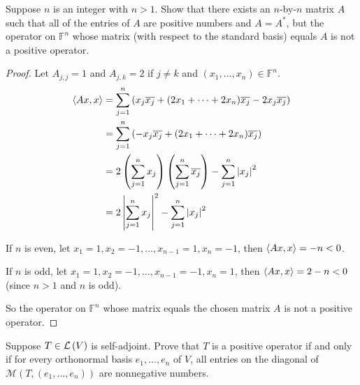 \begin{exercise}
    Suppose $n$ is an integer with $n > 1$. Show that there exists an $n$-by-$n$ matrix $A$ such that all of the entries of $A$ are positive numbers and $A = A^{*}$, but the operator on $\mathbb{F}^{n}$ whose matrix (with respect to the standard basis) equals $A$ is not a positive operator.
\end{exercise}

\begin{proof}
    Let $A_{j,j} = 1$ and $A_{j,k} = 2$ if $j\ne k$ and $(x_{1}, \ldots, x_{n})\in \mathbb{F}^{n}$.
    \begin{align*}
        \left\langle{Ax, x}\right\rangle & = \sum^{n}_{j=1}\left(x_{j}\overline{x_{j}} + (2x_{1} + \cdots + 2x_{n})\overline{x_{j}} - 2x_{j}\overline{x_{j}}\right) \\
                          & = \sum^{n}_{j=1}\left(-x_{j}\overline{x_{j}} + (2x_{1} + \cdots + 2x_{n})\overline{x_{j}}\right)                     \\
                          & = 2\left(\sum^{n}_{j=1}x_{j}\right)\left(\sum^{n}_{j=1}\overline{x_{j}}\right) - \sum^{n}_{j=1}\left\vert{x_{j}}\right\vert^{2}   \\
                          & = 2\left\vert{\sum^{n}_{j=1}x_{j}}\right\vert^{2} - \sum^{n}_{j=1}\left\vert{x_{j}}\right\vert^{2}
    \end{align*}

    If $n$ is even, let $x_{1} = 1, x_{2} = -1, \ldots, x_{n-1} = 1, x_{n} = -1$, then $\left\langle{Ax, x}\right\rangle = -n < 0$.

    If $n$ is odd, let $x_{1} = 1, x_{2} = -1, \ldots, x_{n-1} = -1, x_{n} = 1$, then $\left\langle{Ax, x}\right\rangle = 2 - n < 0$ (since $n > 1$ and $n$ is odd).

    So the operator on $\mathbb{F}^{n}$ whose matrix equals the chosen matrix $A$ is not a positive operator.
\end{proof}
\newpage

\begin{exercise}
    Suppose $T\in\mathcal{L}\left({V}\right)$ is self-adjoint. Prove that $T$ is a positive operator if and only if for every orthonormal basis $e_{1}, \ldots, e_{n}$ of $V$, all entries on the diagonal of $\mathcal{M}(T, (e_{1}, \ldots, e_{n}))$ are nonnegative numbers.
\end{exercise}

